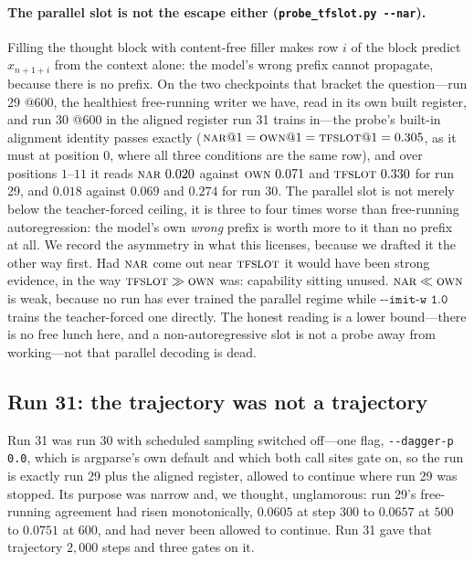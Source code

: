\documentclass{article} %
\begin{document}
\paragraph{The parallel slot is not the escape either (\texttt{probe\_tfslot.py -{}-nar}).} Filling
the thought block with content-free filler makes row $i$ of the block predict $x_{n+1+i}$ from the
context alone: the model's wrong prefix cannot propagate, because there is no prefix. On the two
checkpoints that bracket the question---run 29 @600, the healthiest free-running writer we have, read
in its own built register, and run 30 @600 in the aligned register run 31 trains in---the probe's
built-in alignment identity passes exactly ($\textsc{nar}@1 = \textsc{own}@1 = \textsc{tfslot}@1 =
0.305$, as it must at position $0$, where all three conditions are the same row), and over positions
$1$--$11$ it reads $\textsc{nar}\ 0.020$ against $\textsc{own}\ 0.071$ and $\textsc{tfslot}\ 0.330$
for run 29, and $0.018$ against $0.069$ and $0.274$ for run 30. The parallel slot is not merely below
the teacher-forced ceiling, it is three to four times worse than free-running autoregression: the
model's own \emph{wrong} prefix is worth more to it than no prefix at all. We record the asymmetry in
what this licenses, because we drafted it the other way first. Had $\textsc{nar}$ come out near
$\textsc{tfslot}$ it would have been strong evidence, in the way $\textsc{tfslot} \gg \textsc{own}$
was: capability sitting unused. $\textsc{nar} \ll \textsc{own}$ is weak, because no run has ever
trained the parallel regime while $\texttt{-{}-imit-w 1.0}$ trains the teacher-forced one directly.
The honest reading is a lower bound---there is no free lunch here, and a non-autoregressive slot is
not a probe away from working---not that parallel decoding is dead.

\subsection{Run 31: the trajectory was not a trajectory}
\label{sec:run31}

Run 31 was run 30 with scheduled sampling switched off---one flag, \texttt{-{}-dagger-p 0.0}, which is
argparse's own default and which both call sites gate on, so the run is exactly run 29 plus the
aligned register, allowed to continue where run 29 was stopped. Its purpose was narrow and, we
thought, unglamorous: run 29's free-running agreement had risen monotonically, $0.0605$ at step $300$
to $0.0657$ at $500$ to $0.0751$ at $600$, and had never been allowed to continue. Run 31 gave that
trajectory $2{,}000$ steps and three gates on it.
\end{document}
